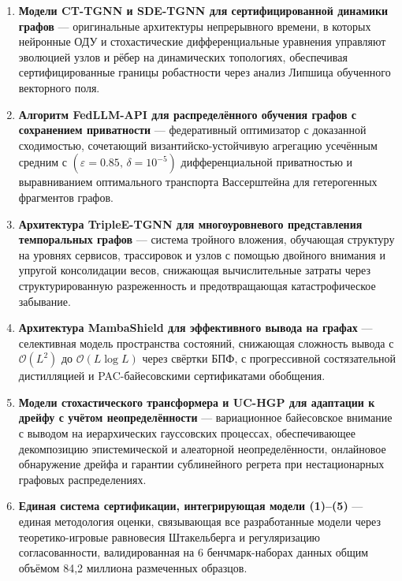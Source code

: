 \documentclass[12pt,a5paper]{article}
\begin{document}
\begin{enumerate}
\item \textbf{Модели CT-TGNN и SDE-TGNN для сертифицированной динамики графов} --- оригинальные архитектуры непрерывного времени, в которых нейронные ОДУ и стохастические дифференциальные уравнения управляют эволюцией узлов и рёбер на динамических топологиях, обеспечивая сертифицированные границы робастности через анализ Липшица обученного векторного поля.

\item \textbf{Алгоритм FedLLM-API для распределённого обучения графов с сохранением приватности} --- федеративный оптимизатор с доказанной сходимостью, сочетающий византийско-устойчивую агрегацию усечённым средним с $(\varepsilon{=}0.85,\,\delta{=}10^{-5})$ дифференциальной приватностью и выравниванием оптимального транспорта Вассерштейна для гетерогенных фрагментов графов.

\item \textbf{Архитектура TripleE-TGNN для многоуровневого представления темпоральных графов} --- система тройного вложения, обучающая структуру на уровнях сервисов, трассировок и узлов с помощью двойного внимания и упругой консолидации весов, снижающая вычислительные затраты через структурированную разреженность и предотвращающая катастрофическое забывание.

\item \textbf{Архитектура MambaShield для эффективного вывода на графах} --- селективная модель пространства состояний, снижающая сложность вывода с $\mathcal{O}(L^{2})$ до $\mathcal{O}(L\log L)$ через свёртки БПФ, с прогрессивной состязательной дистилляцией и PAC-байесовскими сертификатами обобщения.

\item \textbf{Модели стохастического трансформера и UC-HGP для адаптации к дрейфу с учётом неопределённости} --- вариационное байесовское внимание с выводом на иерархических гауссовских процессах, обеспечивающее декомпозицию эпистемической и алеаторной неопределённости, онлайновое обнаружение дрейфа и гарантии сублинейного регрета при нестационарных графовых распределениях.

\item \textbf{Единая система сертификации, интегрирующая модели (1)--(5)} --- единая методология оценки, связывающая все разработанные модели через теоретико-игровые равновесия Штакельберга и регуляризацию согласованности, валидированная на 6 бенчмарк-наборах данных общим объёмом 84,2 миллиона размеченных образцов.
\end{enumerate}
\end{document}
